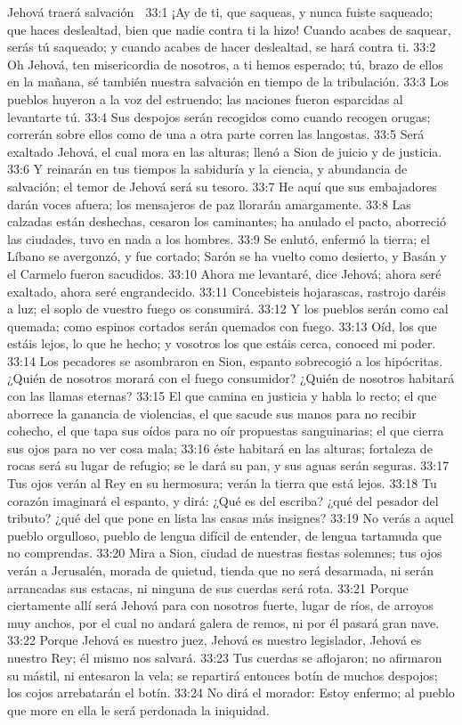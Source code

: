 Jehová traerá salvación  

33:1 ¡Ay de ti, que saqueas, y nunca fuiste saqueado; que haces deslealtad, bien que nadie contra ti la hizo! Cuando acabes de saquear, serás tú saqueado; y cuando acabes de hacer deslealtad, se hará contra ti.  
33:2 Oh Jehová, ten misericordia de nosotros, a ti hemos esperado; tú, brazo de ellos en la mañana, sé también nuestra salvación en tiempo de la tribulación.  
33:3 Los pueblos huyeron a la voz del estruendo; las naciones fueron esparcidas al levantarte tú.  
33:4 Sus despojos serán recogidos como cuando recogen orugas; correrán sobre ellos como de una a otra parte corren las langostas.  
33:5 Será exaltado Jehová, el cual mora en las alturas; llenó a Sion de juicio y de justicia.  
33:6 Y reinarán en tus tiempos la sabiduría y la ciencia, y abundancia de salvación; el temor de Jehová será su tesoro.  
33:7 He aquí que sus embajadores darán voces afuera; los mensajeros de paz llorarán amargamente.  
33:8 Las calzadas están deshechas, cesaron los caminantes; ha anulado el pacto, aborreció las ciudades, tuvo en nada a los hombres.  
33:9 Se enlutó, enfermó la tierra; el Líbano se avergonzó, y fue cortado; Sarón se ha vuelto como desierto, y Basán y el Carmelo fueron sacudidos.  
33:10 Ahora me levantaré, dice Jehová; ahora seré exaltado, ahora seré engrandecido.  
33:11 Concebisteis hojarascas, rastrojo daréis a luz; el soplo de vuestro fuego os consumirá.  
33:12 Y los pueblos serán como cal quemada; como espinos cortados serán quemados con fuego.  
33:13 Oíd, los que estáis lejos, lo que he hecho; y vosotros los que estáis cerca, conoced mi poder.  
33:14 Los pecadores se asombraron en Sion, espanto sobrecogió a los hipócritas. ¿Quién de nosotros morará con el fuego consumidor? ¿Quién de nosotros habitará con las llamas eternas?  
33:15 El que camina en justicia y habla lo recto; el que aborrece la ganancia de violencias, el que sacude sus manos para no recibir cohecho, el que tapa sus oídos para no oír propuestas sanguinarias; el que cierra sus ojos para no ver cosa mala;  
33:16 éste habitará en las alturas; fortaleza de rocas será su lugar de refugio; se le dará su pan, y sus aguas serán seguras.  
33:17 Tus ojos verán al Rey en su hermosura; verán la tierra que está lejos.  
33:18 Tu corazón imaginará el espanto, y dirá: ¿Qué es del escriba? ¿qué del pesador del tributo? ¿qué del que pone en lista las casas más insignes?  
33:19 No verás a aquel pueblo orgulloso, pueblo de lengua difícil de entender, de lengua tartamuda que no comprendas.  
33:20 Mira a Sion, ciudad de nuestras fiestas solemnes; tus ojos verán a Jerusalén, morada de quietud, tienda que no será desarmada, ni serán arrancadas sus estacas, ni ninguna de sus cuerdas será rota. 
33:21 Porque ciertamente allí será Jehová para con nosotros fuerte, lugar de ríos, de arroyos muy anchos, por el cual no andará galera de remos, ni por él pasará gran nave.  
33:22 Porque Jehová es nuestro juez, Jehová es nuestro legislador, Jehová es nuestro Rey; él mismo nos salvará.  
33:23 Tus cuerdas se aflojaron; no afirmaron su mástil, ni entesaron la vela; se repartirá entonces botín de muchos despojos; los cojos arrebatarán el botín.  
33:24 No dirá el morador: Estoy enfermo; al pueblo que more en ella le será perdonada la iniquidad.  
  

